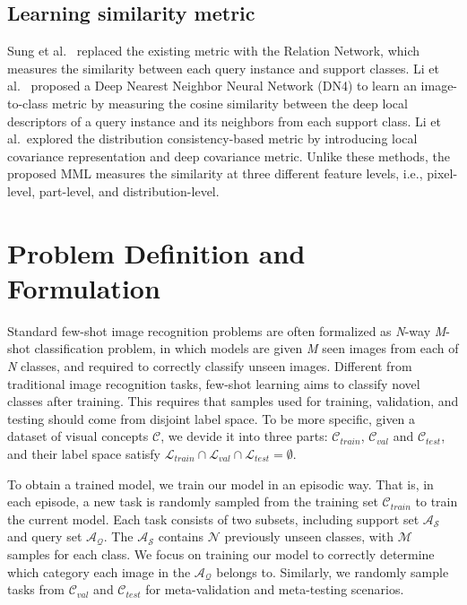\documentclass{article}
\begin{document}
\subsection{Learning similarity metric}
Sung et al.~\cite{sung2018learning} replaced the existing metric with the Relation Network, which measures the similarity between each query instance and support classes. Li et al.~\cite{li2019revisiting} proposed a Deep Nearest Neighbor Neural Network (DN4) to learn an image-to-class metric by measuring the cosine similarity between the deep local descriptors of a query instance and its neighbors from each support class. Li et al.~\cite{li2019distribution}explored the distribution consistency-based metric by introducing local covariance representation and deep covariance metric. Unlike these methods, the proposed MML measures the similarity at three different feature levels, i.e., pixel-level, part-level, and distribution-level.

\section{Problem Definition and Formulation}
Standard few-shot image recognition problems are often formalized as \emph{N}-way \emph{M}-shot classification problem, in which models are given \emph{M} seen images from each of \emph{N} classes, and required to correctly classify unseen images. 
Different from traditional image recognition tasks, few-shot learning aims to classify novel classes after training. This requires
that samples used for training, validation, and testing should
come from disjoint label space.
To be more specific, given a dataset of visual concepts $\mathcal{C}$, we devide it into three parts: $\mathcal{C}_{train}$, $\mathcal{C}_{val}$ and $\mathcal{C}_{test}$, and their label space satisfy $\mathcal{L}_{train}\cap\mathcal{L}_{val}\cap\mathcal{L}_{test}=\emptyset$.

To obtain a trained model, we train our model in an episodic way. That is, in each episode, a new task is randomly sampled from the training set $\mathcal{C}_{train}$ to train the current model. Each task consists of two subsets, including support set $\mathcal{A}_{\mathcal{S}}$ and query set $\mathcal{A}_{\mathcal{Q}}$. The $\mathcal{A}_{\mathcal{S}}$ contains $\mathcal{N}$ previously unseen classes, with $\mathcal{M}$ samples for each class. We focus on training our model to correctly determine which category each image in the $\mathcal{A}_{\mathcal{Q}}$ belongs to. Similarly, we randomly sample tasks from $\mathcal{C}_{val}$ and $\mathcal{C}_{test}$ for meta-validation and meta-testing scenarios.
\end{document}
